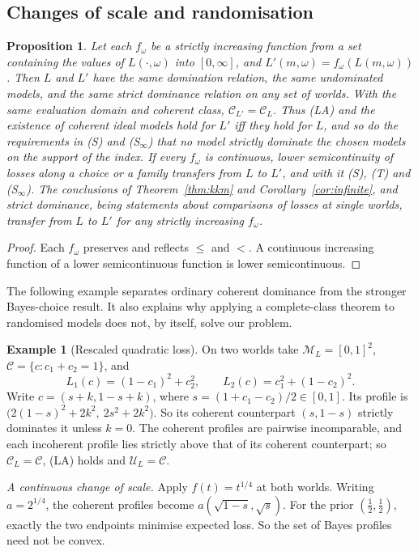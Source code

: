 \documentclass[11pt]{article}
\newtheorem{proposition}[theorem]{Proposition}
\theoremstyle{definition}
\newtheorem{example}[theorem]{Example}
\theoremstyle{remark}
\newcommand{\M}{\mathcal M}
\newcommand{\C}{\mathcal C}
\newcommand{\U}{\mathcal U}
\begin{document}
\subsection{Changes of scale and randomisation}\label{sec:ordinal}
\begin{proposition}\label{prop:ordinal}
Let each $f_\omega$ be a strictly increasing function from a set containing the values of $L(\cdot,\omega)$ into $[0,\infty]$, and $L'(m,\omega)=f_\omega(L(m,\omega))$. Then $L$ and $L'$ have the same domination relation, the same undominated models, and the same strict dominance relation on any set of worlds. With the same evaluation domain and coherent class, $\C_{L\prime}=\C_L$. Thus (LA) and the existence of coherent ideal models hold for $L'$ iff they hold for $L$, and so do the requirements in (S) and (S$_\infty$) that no model strictly dominate the chosen models on the support of the index. If every $f_\omega$ is continuous, lower semicontinuity of losses along a choice or a family transfers from $L$ to $L'$, and with it (S), (T) and (S$_\infty$). The conclusions of Theorem~\ref{thm:kkm} and Corollary~\ref{cor:infinite}, and strict dominance, being statements about comparisons of losses at single worlds, transfer from $L$ to $L'$ for any strictly increasing $f_\omega$.
\end{proposition}
\begin{proof}
Each $f_\omega$ preserves and reflects $\le$ and $<$. A continuous increasing function of a lower semicontinuous function is lower semicontinuous.
\end{proof}

The following example separates ordinary coherent dominance from the stronger Bayes-choice result. It also explains why applying a complete-class theorem to randomised models does not, by itself, solve our problem.
\begin{example}[Rescaled quadratic loss]\label{ex:rescale}
On two worlds take $\M_L=[0,1]^2$, $\C=\{c:c_1+c_2=1\}$, and
\[
 L_1(c)=(1-c_1)^2+c_2^2,\qquad L_2(c)=c_1^2+(1-c_2)^2.
\]
Write $c=(s+k,1-s+k)$, where $s=(1+c_1-c_2)/2\in[0,1]$. Its profile is $\bigl(2(1-s)^2+2k^2,\ 2s^2+2k^2\bigr)$. So its coherent counterpart $(s,1-s)$ strictly dominates it unless $k=0$. The coherent profiles are pairwise incomparable, and each incoherent profile lies strictly above that of its coherent counterpart; so $\C_L=\C$, (LA) holds and $\U_L=\C$.

\emph{A continuous change of scale.} Apply $f(t)=t^{1/4}$ at both worlds. Writing $a=2^{1/4}$, the coherent profiles become $a(\sqrt{1-s},\sqrt s)$. For the prior $(\tfrac12,\tfrac12)$, exactly the two endpoints minimise expected loss. So the set of Bayes profiles need not be convex.

\end{example}
\end{document}
